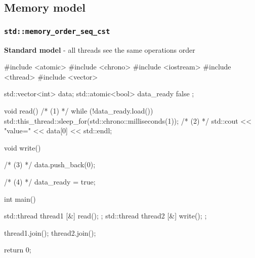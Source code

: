 \documentclass[../main]{subfiles}
\begin{document}
\subsection{Memory model}
\subsubsection{\texttt{std::memory\_order\_seq\_cst}}
    \textbf{Standard model} - all threads see the same operations order
\begin{Code}
    #include <atomic>
    #include <chrono>
    #include <iostream>
    #include <thread>
    #include <vector>

    std::vector<int> data;
    std::atomic<bool> data_ready{ false };

    void read()
    {
        /* (1) */
        while (!data_ready.load())
        {
            std::this_thread::sleep_for(std::chrono::milliseconds(1));
        }
        /* (2) */
        std::cout << "value=" << data[0] << std::endl;
    }

    void write()
    {
        /* (3) */
        data.push_back(0);

        /* (4) */
        data_ready = true;
    }

    int main()
    {
        std::thread thread1{ [&] { read(); } };
        std::thread thread2{ [&] { write(); } };

        thread1.join();
        thread2.join();

        return 0;
    }
\end{Code}
\end{document}

